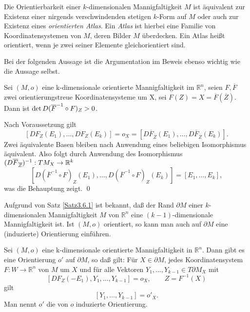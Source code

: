 \documentclass[a4paper,twoside,DIV15,BCOR12mm]{scrbook}
\begin{document}
\bigskip

 Die Orientierbarkeit einer 
$k$-dimensionalen Mannigfaltigkeit $M$ ist äquivalent zur Existenz 
einer nirgends verschwindenden stetigen $k$-Form auf $M$ oder auch zur Existenz 
eines {\em orientierten Atlas}. Ein {\em Atlas} ist hierbei eine Familie von 
Koordinatensystemen von $M$, deren Bilder $M$ überdecken. Ein Atlas heißt orientiert, 
wenn je zwei seiner Elemente gleichorientiert sind. 

\bigskip


\noindent
Bei der folgenden Aussage ist die Argumentation im Beweis ebenso wichtig 
wie die Aussage selbst.\\


\begin{lemma}\label{Lemma3.6.6} {Sei $(M,o)$ eine k-dimensionale 
orientierte Mannigfaltigkeit im ${\mathbb R}^{n}$, seien $F, 
\overline{F}$ zwei orientierungstreue Koordinatensysteme um X, sei 
$F(Z) = X = \overline{F}(\overline{Z})$. Dann ist ${\rm det}\, 
D(\overline{F}^{-1} \circ F)_{Z} > 0$.}
\end{lemma}

\bigskip

 Nach Voraussetzung gilt
\[ [DF_{Z}(E_{1}),\dots,DF_{Z}(E_{k})] = o_{X} = 
[D\overline{F}_{\overline{Z}}(E_{1}),
\dots,D\overline{F}_{\overline{Z}}(E_{k})]. \]
Zwei äquivalente Basen bleiben nach Anwendung eines beliebigen 
Isomorphismus äquivalent. Also folgt durch Anwendung des Isomorphismus  
$(D\overline{F}_{\overline{Z}})^{-1}:
TM_X\to \mathbb{R}^k$
\[ \left[D(\overline{F}^{-1} \circ F)_{Z} 
(E_{1}),\dots,D(\overline{F}^{-1} \circ F)_{Z}(E_{k})\right] = 
[E_{1},\dots,E_{k}], \]
was die Behauptung zeigt. \qed\\

\bigskip

\noindent
Aufgrund von Satz \ref{Satz3.6.1} ist bekannt, daß der Rand $\partial M$ einer 
$k$-dimensionalen Mannigfaltigkeit $M$ von ${\mathbb R}^{n}$ eine 
$(k-1)$-dimensionale Mannigfaltigkeit ist. Ist $(M,o)$ orientiert, so 
kann man auch auf $\partial M$ eine (induzierte) Orientierung 
einführen.

\bigskip

\begin{satz}\label{Satz3.6.7} {Sei $(M,o)$ eine k-dimensionale 
orientierte Mannigfaltigkeit in ${\mathbb R}^{n}$. Dann gibt es eine 
Orientierung $o'$ auf $\partial M$, so daß gilt: Für $X \in 
\partial M$, jedes Koordinatensystem $F: W \to {\mathbb R}^{n}$ von 
$M$ um $X$ und für alle Vektoren $Y_{1},\dots,Y_{k-1} \in T\partial 
M_{X}$ mit
\[ [DF_{Z}(-E_{1}),Y_{1},\dots,Y_{k-1}] = o_{X},\qquad  Z = F^{-1}(X)\]
gilt
\[ [Y_{1},\dots,Y_{k-1}] = o'_{X}. \]
Man nennt $o'$ die von $o$ induzierte Orientierung.}
\end{satz}
\end{document}
